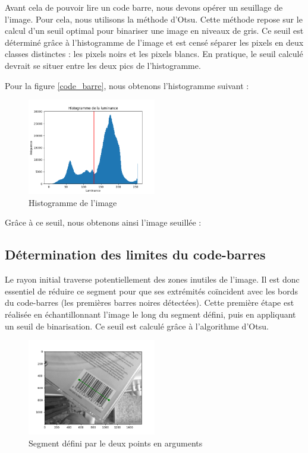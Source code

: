 \documentclass{rapport}
\begin{document}
Avant cela de pouvoir lire un code barre, nous devons opérer un seuillage de l'image. Pour cela, nous utilisons la méthode d'Otsu.
Cette méthode repose sur le calcul d'un seuil optimal pour binariser une image en niveaux de gris.
Ce seuil est déterminé grâce à l'histogramme de l'image et est censé séparer les pixels en deux classes distinctes : les pixels noirs et les pixels blancs.
En pratique, le seuil calculé devrait se situer entre les deux pics de l'histogramme.

Pour la figure \ref{code_barre}, nous obtenons l'histogramme suivant :

\begin{figure}[H] 
	\centering
	\includegraphics[width=0.5\textwidth]{images/histogramme.png}
	\caption{Histogramme de l'image}
	\label{histogramme}
\end{figure}

Grâce à ce seuil, nous obtenons ainsi l'image seuillée : 

\subsection{Détermination des limites du code-barres}

Le rayon initial traverse potentiellement des zones inutiles de l'image. Il est donc essentiel de réduire ce segment pour que ses extrémités coïncident avec les bords du code-barres (les premières barres noires détectées).  
Cette première étape est réalisée en échantillonnant l’image le long du segment défini, puis en appliquant un seuil de binarisation. Ce seuil est calculé grâce à l’algorithme d’Otsu.  

\begin{figure}[H] %
	\centering
	\includegraphics[width=0.5\textwidth]{images/code_barre_couple_vert.png}
	\caption{Segment défini par le deux points en arguments}
\end{figure}
\end{document}
